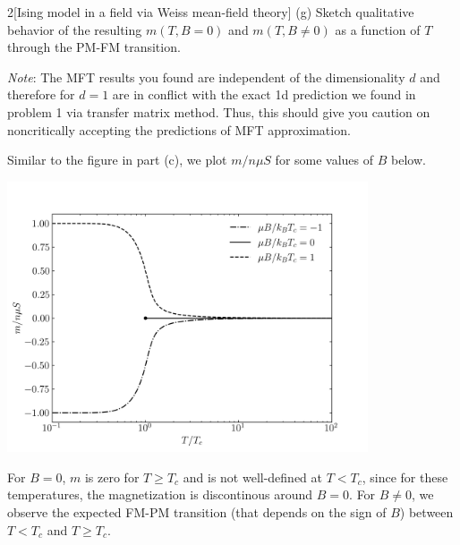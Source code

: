 \documentclass[12pt]{article}
\begin{document}
\begin{problem}{2}[Ising model in a field via Weiss mean-field theory]
(g) Sketch qualitative behavior of the resulting $m(T,B=0)$ and $m(T,B\neq0)$ as
a function of $T$ through the PM-FM transition.

\textit{Note}: The MFT results you found are independent of the dimensionality
$d$ and therefore for $d=1$ are in conflict with the exact 1d prediction we
found in problem 1 via transfer matrix method. Thus, this should give you
caution on noncritically accepting the predictions of MFT approximation.
\begin{solution}
Similar to the figure in part (c), we plot $m/n\mu S$ for some values of $B$
below.
\begin{center}
    \includegraphics[width=0.8\textwidth]{p2g.png} 
\end{center}
For $B=0$, $m$ is zero for $T\geq T_c$ and is not well-defined at $T<T_c$, 
since for these temperatures, the magnetization is discontinous around $B=0$.
For $B\neq 0$, we observe the expected FM-PM transition (that depends
on the sign of $B$) between $T<T_c$ and $T\geq T_c$.
\end{solution}
\end{problem}
\newpage
\end{document}

